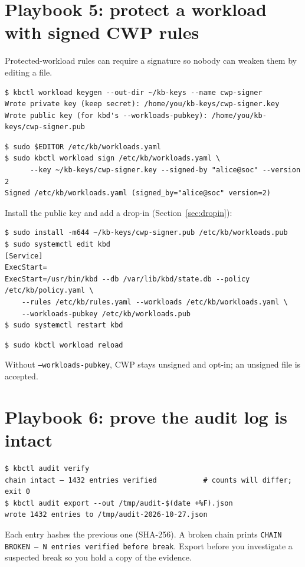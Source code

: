 \section{Playbook 5: protect a workload with signed CWP rules}
\label{sec:cwp}
Protected-workload rules can require a signature so nobody can weaken them by editing a file.
\resetsteps
{}
\begin{lstlisting}[style=console]
$ kbctl workload keygen --out-dir ~/kb-keys --name cwp-signer
Wrote private key (keep secret): /home/you/kb-keys/cwp-signer.key
Wrote public key (for kbd's --workloads-pubkey): /home/you/kb-keys/cwp-signer.pub
\end{lstlisting}
\begin{lstlisting}[style=console]
$ sudo $EDITOR /etc/kb/workloads.yaml
$ sudo kbctl workload sign /etc/kb/workloads.yaml \
      --key ~/kb-keys/cwp-signer.key --signed-by "alice@soc" --version 2
Signed /etc/kb/workloads.yaml (signed_by="alice@soc" version=2)
\end{lstlisting}
 Install the public key and add a drop-in (Section~\ref{sec:dropin}):
\begin{lstlisting}[style=console]
$ sudo install -m644 ~/kb-keys/cwp-signer.pub /etc/kb/workloads.pub
$ sudo systemctl edit kbd
[Service]
ExecStart=
ExecStart=/usr/bin/kbd --db /var/lib/kbd/state.db --policy /etc/kb/policy.yaml \
    --rules /etc/kb/rules.yaml --workloads /etc/kb/workloads.yaml \
    --workloads-pubkey /etc/kb/workloads.pub
$ sudo systemctl restart kbd
\end{lstlisting}
\step{Push live to every connected sensor.}
\begin{lstlisting}[style=console]
$ sudo kbctl workload reload
\end{lstlisting}
Without \texttt{--workloads-pubkey}, CWP stays unsigned and opt-in; an unsigned file is accepted.

\section{Playbook 6: prove the audit log is intact}
\label{sec:audit}
\begin{lstlisting}[style=console]
$ kbctl audit verify
chain intact — 1432 entries verified           # counts will differ; exit 0
$ kbctl audit export --out /tmp/audit-$(date +%F).json
wrote 1432 entries to /tmp/audit-2026-10-27.json
\end{lstlisting}
Each entry hashes the previous one (SHA-256). A broken chain prints
\texttt{CHAIN BROKEN — N entries verified before break}. Export before you investigate a suspected break so
you hold a copy of the evidence.

